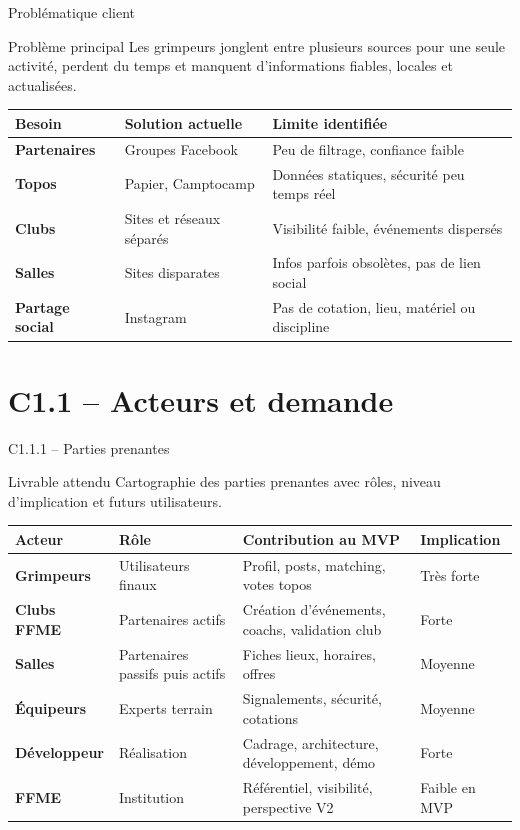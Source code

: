 \documentclass[aspectratio=169,11pt]{beamer}
\newcommand{\competence}[2]{%
  \begin{block}{#1}
    #2
  \end{block}
}
\begin{document}
\begin{frame}{Problématique client}
  \begin{block}{Problème principal}
    Les grimpeurs jonglent entre plusieurs sources pour une seule activité, perdent du temps et manquent d'informations fiables, locales et actualisées.
  \end{block}
  \vspace{0.2cm}
  \begin{tabularx}{\textwidth}{>{\bfseries}p{3.2cm} X X}
    Besoin & Solution actuelle & Limite identifiée \\
    \hline
    Partenaires & Groupes Facebook & Peu de filtrage, confiance faible \\
    Topos & Papier, Camptocamp & Données statiques, sécurité peu temps réel \\
    Clubs & Sites et réseaux séparés & Visibilité faible, événements dispersés \\
    Salles & Sites disparates & Infos parfois obsolètes, pas de lien social \\
    Partage social & Instagram & Pas de cotation, lieu, matériel ou discipline \\
  \end{tabularx}
\end{frame}

\section{C1.1 -- Acteurs et demande}

\begin{frame}{C1.1.1 -- Parties prenantes}
  \competence{Livrable attendu}{Cartographie des parties prenantes avec rôles, niveau d'implication et futurs utilisateurs.}
  \small
  \begin{tabularx}{\textwidth}{>{\bfseries}p{2.6cm} p{2.1cm} X p{2.2cm}}
    Acteur & Rôle & Contribution au MVP & Implication \\
    \hline
    Grimpeurs & Utilisateurs finaux & Profil, posts, matching, votes topos & Très forte \\
    Clubs FFME & Partenaires actifs & Création d'événements, coachs, validation club & Forte \\
    Salles & Partenaires passifs puis actifs & Fiches lieux, horaires, offres & Moyenne \\
    Équipeurs & Experts terrain & Signalements, sécurité, cotations & Moyenne \\
    Développeur & Réalisation & Cadrage, architecture, développement, démo & Forte \\
    FFME & Institution & Référentiel, visibilité, perspective V2 & Faible en MVP \\
  \end{tabularx}
\end{frame}
\end{document}
